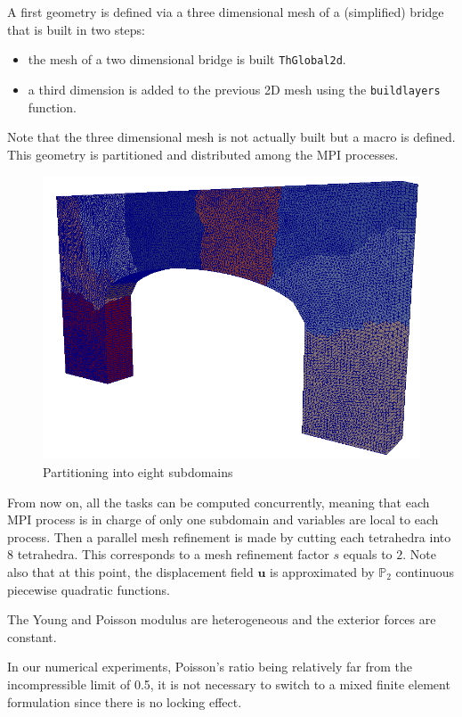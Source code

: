 A first geometry is defined via a three dimensional mesh of a (simplified) bridge that is built in two steps:
\begin{itemize}
	\item the mesh of a two dimensional bridge is built {\tt ThGlobal2d}. 
	\item a third dimension is added to the previous 2D mesh using the {\tt buildlayers} function.
\end{itemize}
Note that the three dimensional mesh is not actually built but a macro is defined. 
This geometry is partitioned and distributed among the MPI processes.
\begin{figure}
\centering
\includegraphics[width=.4\textwidth]{PARALLEL/part.png}
\caption[]{Partitioning into eight subdomains}
\end{figure}
From now on, all the tasks can be computed concurrently, meaning that each MPI process is in charge of only one subdomain and variables are local to each process. Then a parallel mesh refinement is made by cutting each tetrahedra into $8$ tetrahedra. This corresponds to a mesh refinement factor $s$ equals to $2$. Note also that at this point, the displacement field $\mathbf{u}$ is approximated by ${\mathbb P}_2$ continuous piecewise quadratic functions.



The Young and Poisson modulus are heterogeneous and the exterior forces are constant.
\begin{remark}
In our numerical experiments, Poisson's ratio being relatively far from the incompressible limit of 0.5, it is not necessary to switch to a mixed finite element formulation since there is no locking effect. 
\end{remark}



